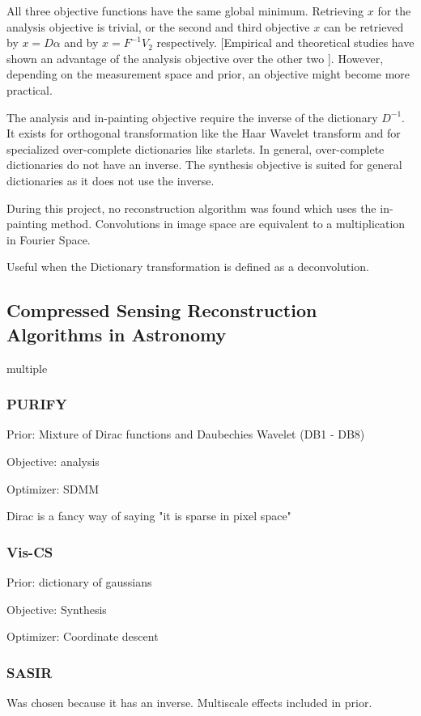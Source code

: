 All three objective functions have the same global minimum. Retrieving $x$ for the analysis objective is trivial, or the second and third objective $x$ can be retrieved by $x = D\alpha$ and by $x = F^{-1}V_2$ respectively. [Empirical and theoretical studies have shown an advantage of the analysis objective over the other two \cite{something}]. However, depending on the measurement space and prior, an objective might become more practical. 

The analysis and in-painting objective require the inverse of the dictionary $D^{-1}$. It exists for orthogonal transformation like the Haar Wavelet transform and for specialized over-complete dictionaries like starlets. In general, over-complete dictionaries do not have an inverse. The synthesis objective is suited for general dictionaries as it does not use the inverse.

During this project, no reconstruction algorithm was found which uses the in-painting method. 
Convolutions in image space are equivalent to a multiplication in Fourier Space.

Useful when the Dictionary transformation is defined as a deconvolution.


\subsection{Compressed Sensing Reconstruction Algorithms in Astronomy}
multiple 

\subsubsection{PURIFY}
Prior: Mixture of Dirac functions and Daubechies Wavelet (DB1 - DB8)

Objective: analysis

Optimizer: SDMM

Dirac is a fancy way of saying "it is sparse in pixel space"


\subsubsection{Vis-CS}
Prior: dictionary of gaussians

Objective: Synthesis

Optimizer: Coordinate descent


\subsubsection{SASIR}
Was chosen because it has an inverse. Multiscale effects included in prior.

